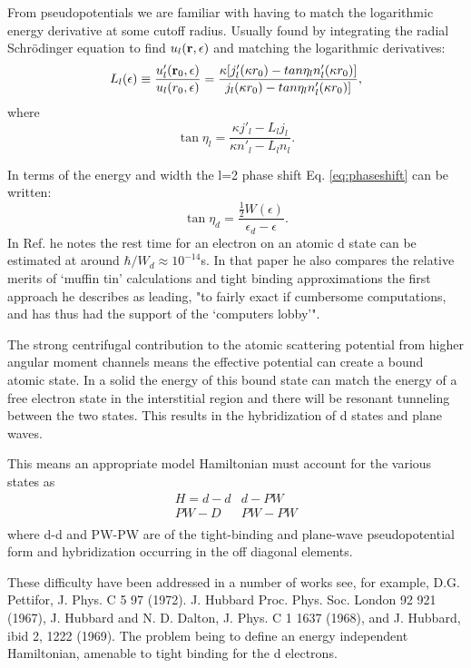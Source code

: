 \documentclass{article}
\def\r{{\bf r}}
\begin{document}
From pseudopotentials we are familiar with having to match the logarithmic energy
derivative at some cutoff radius. Usually found by integrating the radial
Schr\"odinger equation to find $u_{l}(\r,\epsilon)$ and matching the logarithmic derivatives:
%
\begin{equation}
L_{l}(\epsilon) \equiv \frac{u'_{l}(\r_{0},\epsilon)}{u_{l}(r_{0},\epsilon)} = \frac{\kappa[j'_{l}
(\kappa r_{0}) - tan \eta_{l} n'_{l}(\kappa r_{0})]} {j_{l}(\kappa r_{0}) - tan \eta_{l} n_{l}'(\kappa r_{0})]},
\end{equation}
%
where
\begin{equation}
\label{eq:phaseshift}
\tan \eta_{l} = \frac{\kappa j'_{l} - L_{l}j_{l}}{\kappa n'_{l} - L_{l}n_{l}}.
\end{equation}

In terms of the energy and width the l=2 phase shift Eq. \ref{eq:phaseshift} 
can be written:
%
\begin{equation}
\label{eq:dshift}
\tan \eta_{d} = \frac{\frac{1}{2}W(\epsilon)}{\epsilon_{d}-\epsilon}.
\end{equation}
%
In Ref. \cite{friedel73} he notes the rest time for an electron on an atomic d state 
can be estimated at around $\hbar/W_{d}\approx 10^{-14}$s. In that paper he also
compares the relative merits of `muffin tin' calculations and tight binding approximations
the first approach he describes as leading, "to fairly exact if cumbersome
computations, and has thus had the support of the `computers lobby'".

The strong centrifugal contribution to the
atomic scattering potential from higher angular moment channels means the effective potential
can create a bound atomic state. In a solid the energy of this bound state can match the 
energy of a free electron state in the interstitial region and there will
be resonant tunneling between the two states. This results in the hybridization of d states
and plane waves. 

This means an appropriate model Hamiltonian must account for the various states as
%
\begin{eqnarray}
\label{eq:d-hamiltonian}
H = d-d  & d-PW \\
    PW-D & PW-PW \\
\end{eqnarray}
%
where d-d and PW-PW are of the tight-binding and plane-wave 
pseudopotential form and hybridization occurring in the 
off diagonal elements. 

These difficulty have been addressed in a number of works 
see, for example, D.G. Pettifor, J. Phys. C 5 97 (1972).
J. Hubbard Proc. Phys. Soc. London 92 921 (1967),
J. Hubbard and N. D. Dalton, J. Phys. C 1 1637 (1968),
and J. Hubbard, ibid 2, 1222 (1969). The problem being to define an
energy independent Hamiltonian, amenable to tight binding for the d electrons.
\end{document}
